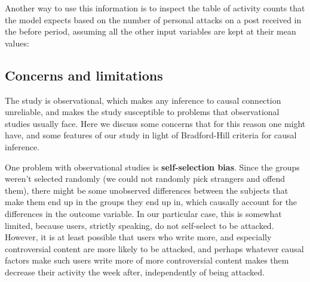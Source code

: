 \documentclass[a4paper,fleqn]{cas-dc}
\begin{document}
Another way to use this information is to inspect the table of activity
counts that the model expects based on the number of personal attacks on
a post received in the before period, assuming all the other input
variables are kept at their mean values:

\begin{table}
\centering\begingroup\fontsize{9}{11}\selectfont

\endgroup{}
\caption{Activity counts expected by the model based on personal attacks received, with other variables fixed at their mean level.}
\end{table}


\subsection{Concerns and limitations}

The study is observational, which makes any inference to causal
connection unreliable, and makes the study susceptible to problems that
observational studies usually face. Here we discuss some concerns that
for this reason one might have, and some features of our study in light
of Bradford-Hill criteria for causal inference.

One problem with observational studies is \textbf{self-selection bias}.
Since the groups weren't selected randomly (we could not randomly pick
strangers and offend them), there might be some unobserved differences
between the subjects that make them end up in the groups they end up in,
which causally account for the differences in the outcome variable. In
our particular case, this is somewhat limited, because users, strictly
speaking, do not self-select to be attacked. However, it is at least
possible that users who write more, and especially controversial content
are more likely to be attacked, and perhaps whatever causal factors make
such users write more of more controversial content makes them decrease
their activity the week after, independently of being attacked.
\end{document}
